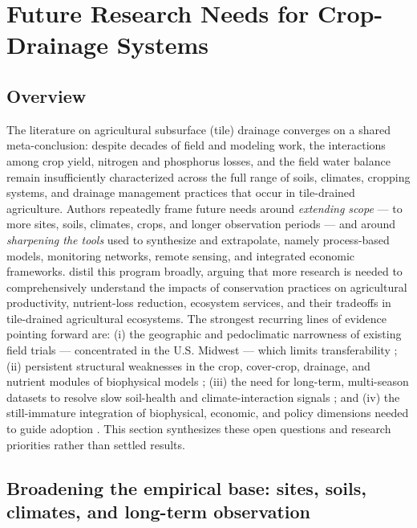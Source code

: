 \documentclass[11pt]{article}
\begin{document}
\section*{Future Research Needs for Crop-Drainage Systems}

\subsection{Overview}

The literature on agricultural subsurface (tile) drainage converges on a shared meta-conclusion: despite decades of field and modeling work, the interactions among crop yield, nitrogen and phosphorus losses, and the field water balance remain insufficiently characterized across the full range of soils, climates, cropping systems, and drainage management practices that occur in tile-drained agriculture. Authors repeatedly frame future needs around \emph{extending scope} --- to more sites, soils, climates, crops, and longer observation periods --- and around \emph{sharpening the tools} used to synthesize and extrapolate, namely process-based models, monitoring networks, remote sensing, and integrated economic frameworks. \textcite{Ma2025} distil this program broadly, arguing that more research is needed to comprehensively understand the impacts of conservation practices on agricultural productivity, nutrient-loss reduction, ecosystem services, and their tradeoffs in tile-drained agricultural ecosystems. The strongest recurring lines of evidence pointing forward are: (i) the geographic and pedoclimatic narrowness of existing field trials --- concentrated in the U.S. Midwest --- which limits transferability \parencite{Zhao2016,Birru2023}; (ii) persistent structural weaknesses in the crop, cover-crop, drainage, and nutrient modules of biophysical models \parencite{Dietzel2016,Chatterjee2025,Feyereisen2006}; (iii) the need for long-term, multi-season datasets to resolve slow soil-health and climate-interaction signals \parencite{Kaspar2012,Bawa2023,Saha2024}; and (iv) the still-immature integration of biophysical, economic, and policy dimensions needed to guide adoption \parencite{Ferin2023,Malone2023,Qin2025}. This section synthesizes these open questions and research priorities rather than settled results.

\subsection{Broadening the empirical base: sites, soils, climates, and long-term observation}
\end{document}
